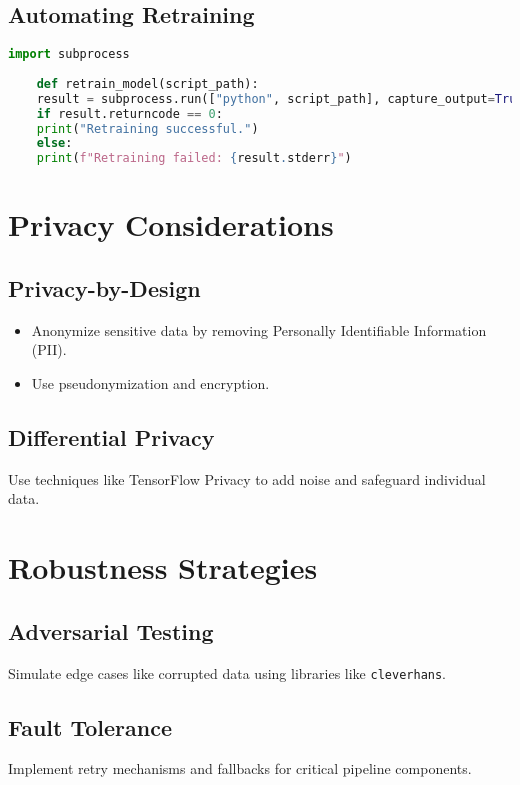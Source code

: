 \subsection{Automating Retraining}
\begin{lstlisting}[language=Python, caption={Retraining a Model Using an External Python Script}, label={code:model-retraining}, style=pythonstyle]
	import subprocess
	
	def retrain_model(script_path):
	result = subprocess.run(["python", script_path], capture_output=True, text=True)
	if result.returncode == 0:
	print("Retraining successful.")
	else:
	print(f"Retraining failed: {result.stderr}")
\end{lstlisting}


\section{Privacy Considerations}
\subsection{Privacy-by-Design}
\begin{itemize}
    \item Anonymize sensitive data by removing Personally Identifiable Information (PII).
    \item Use pseudonymization and encryption.
\end{itemize}

\subsection{Differential Privacy}
Use techniques like TensorFlow Privacy to add noise and safeguard individual data.

\section{Robustness Strategies}
\subsection{Adversarial Testing}
Simulate edge cases like corrupted data using libraries like \texttt{cleverhans}.

\subsection{Fault Tolerance}
Implement retry mechanisms and fallbacks for critical pipeline components.

